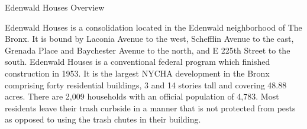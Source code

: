 Edenwald Houses Overview

Edenwald Houses is a consolidation located in the Edenwald neighborhood of The Bronx. It is bound by Laconia Avenue to the west, Schefflin Avenue to the east, Grenada Place and Baychester Avenue to the north, and E 225th Street to the south. Edenwald Houses is a conventional federal program which finished construction in 1953. It is the largest NYCHA development in the Bronx comprising forty residential buildings, 3 and 14 stories tall and covering 48.88 acres. There are 2,009 households with an official population of 4,783. Most residents leave their trash curbside in a manner that is not protected from pests as opposed to using the trash chutes in their building.